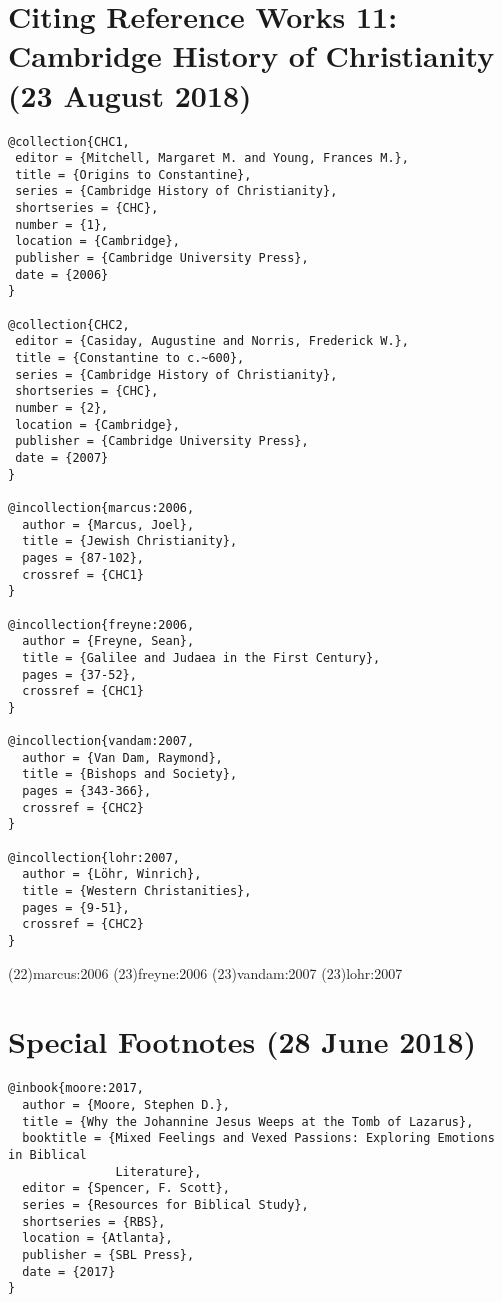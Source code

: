 \documentclass[a4paper]{article}
\begin{document}
\section{Citing Reference Works 11: Cambridge History of Christianity (23 August 2018)}

\begin{verbatim}
@collection{CHC1,
 editor = {Mitchell, Margaret M. and Young, Frances M.},
 title = {Origins to Constantine},
 series = {Cambridge History of Christianity},
 shortseries = {CHC},
 number = {1},
 location = {Cambridge},
 publisher = {Cambridge University Press},
 date = {2006}
}

@collection{CHC2,
 editor = {Casiday, Augustine and Norris, Frederick W.},
 title = {Constantine to c.~600},
 series = {Cambridge History of Christianity},
 shortseries = {CHC},
 number = {2},
 location = {Cambridge},
 publisher = {Cambridge University Press},
 date = {2007}
}

@incollection{marcus:2006,
  author = {Marcus, Joel},
  title = {Jewish Christianity},
  pages = {87-102},
  crossref = {CHC1}
}

@incollection{freyne:2006,
  author = {Freyne, Sean},
  title = {Galilee and Judaea in the First Century},
  pages = {37-52},
  crossref = {CHC1}
}

@incollection{vandam:2007,
  author = {Van Dam, Raymond},
  title = {Bishops and Society},
  pages = {343-366},
  crossref = {CHC2}
}

@incollection{lohr:2007,
  author = {Löhr, Winrich},
  title = {Western Christanities},
  pages = {9-51},
  crossref = {CHC2}
}
\end{verbatim}

\examplecite(22){marcus:2006}
\examplecite(23){freyne:2006}
\examplecite(23){vandam:2007}
\examplecite(23){lohr:2007}
\exampleabbreviations
\examplebibliography
{}

\section{Special Footnotes (28 June 2018)}

\begin{verbatim}
@inbook{moore:2017,
  author = {Moore, Stephen D.},
  title = {Why the Johannine Jesus Weeps at the Tomb of Lazarus},
  booktitle = {Mixed Feelings and Vexed Passions: Exploring Emotions in Biblical
               Literature},
  editor = {Spencer, F. Scott},
  series = {Resources for Biblical Study},
  shortseries = {RBS},
  location = {Atlanta},
  publisher = {SBL Press},
  date = {2017}
}
\end{verbatim}
\end{document}
